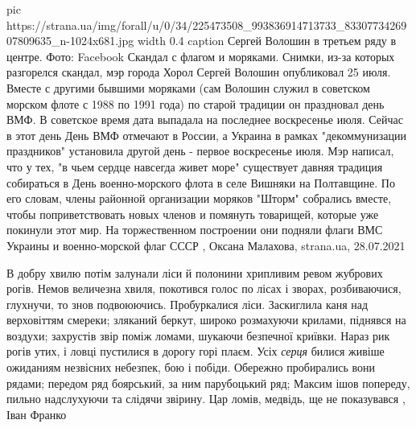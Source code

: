 \ifcmt
  pic https://strana.ua/img/forall/u/0/34/225473508_993836914713733_8330773426907809635_n-1024x681.jpg
  width 0.4
	caption Сергей Волошин в третьем ряду в центре. Фото: Facebook
\fi
Скандал с флагом и моряками.  Снимки, из-за которых разгорелся скандал, мэр
города Хорол Сергей Волошин опубликовал 25 июля. Вместе с другими бывшими
моряками (сам Волошин служил в советском морском флоте с 1988 по 1991 года) по
старой традиции он праздновал день ВМФ.  В советское время дата выпадала на
последнее воскресенье июля. Сейчас в этот день День ВМФ отмечают в России, а
Украина в рамках "декоммунизации праздников" установила другой день - первое
воскресенье июля.  Мэр написал, что у тех, "в чьем сердце навсегда живет море"
существует давняя традиция собираться в День военно-морского флота в селе
Вишняки на Полтавщине.  По его словам, члены районной организации моряков
"Шторм" собрались вместе, чтобы поприветствовать новых членов и помянуть
товарищей, которые уже покинули этот мир.  На торжественном построении они
подняли флаги ВМС Украины и военно-морской флаг СССР
, 
Оксана Малахова, strana.ua, 28.07.2021

В добру хвилю потім залунали ліси й полонини хрипливим ревом жубрових рогів.
Немов величезна хвиля, покотився голос по лісах і зворах, розбиваючися,
глухнучи, то знов подвоюючись. Пробуркалися ліси. Заскиглила каня над
верховіттям смереки; зляканий беркут, широко розмахуючи крилами, піднявся на
воздухи; захрустів звір поміж ломами, шукаючи безпечної криївки. Нараз рик
рогів утих, і ловці пустилися в дорогу горі плаєм. Усіх \emph{серця} билися живіше
ожиданиям незвісних небезпек, бою і побіди. Обережно пробирались вони рядами;
передом ряд боярський, за ним парубоцький ряд; Максим ішов попереду, пильно
надслухуючи та слідячи звірину. Цар ломів, медвідь, ще не показувався
, Іван Франко
